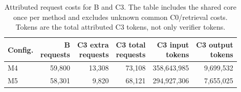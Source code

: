 \begin{table}[htbp]
\centering
\small
\caption{Attributed request costs for B and C3. The table includes the shared core once per method
and excludes unknown common C0/retrieval costs. Tokens are the total attributed C3 tokens,
not only verifier tokens.}
\label{tab:costs}
\setlength{\tabcolsep}{5pt}
\begin{tabular}{@{}lrrrrr@{}}
\toprule
Config. & \shortstack{B\\requests} & \shortstack{C3 extra\\requests} & \shortstack{C3 total\\requests} & \shortstack{C3 input\\tokens} & \shortstack{C3 output\\tokens} \\
\midrule
M4 & 59,800 & 13,308 & 73,108 & 358,643,985 & 9,699,532 \\
M5 & 58,301 & 9,820 & 68,121 & 294,927,306 & 7,655,025 \\
\bottomrule
\end{tabular}
\end{table}
